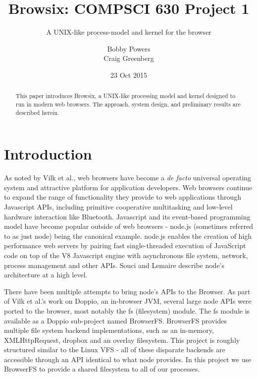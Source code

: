 \documentclass{acm_proc_article-sp}
\begin{document}
\title{Browsix: COMPSCI 630 Project 1}
\subtitle{A UNIX-like process-model and kernel for the browser}

\author{
\alignauthor Bobby Powers\\
\alignauthor Craig Greenberg\\
}
\date{23 Oct 2015}

\maketitle
\begin{abstract}
  This paper introduces Browsix, a UNIX-like processing model and
  kernel designed to run in modern web browsers.  The approach, system
  design, and preliminary results are described herein.
\end{abstract}

\section{Introduction}

As noted by Vilk et al., web browsers have become a \emph{de facto}
universal operating system and attractive platform for application
developers\cite{vilk:2014doppio}.  Web browsers continue to expand the
range of functionality they provide to web applications through
Javascript APIs, including primitive cooperative
multitasking\cite{mcilroy:2015chrome47} and low-level hardware
interaction like Bluetooth\cite{yasskin:2015webbluetooth}.  Javascript
and its event-based programming model have become popular outside of
web browsers - node.js (sometimes referred to as just node) being the
canonical example.  node.js enables the creation of high performance
web servers by pairing fast single-threaded execution of JavaScript
code on top of the V8 Javascript engine with asynchronous file system,
network, process management and other APIs.  Souci and
Lemaire\cite{souci:2014} describe node's architecture at a high level.

There have been multiple attempts to bring node's APIs to the Browser.
As part of Vilk et al.'s work on Doppio, an in-browser JVM, several
large node APIs were ported to the browser, most notably the fs
(filesystem) module.  The fs module is available as a Doppio
sub-project named BrowserFS.  BrowserFS provides multiple file system
backend implementations, such as an in-memory, XMLHttpRequest, dropbox
and an overlay filesystem.  This project is roughly structured similar
to the Linux VFS - all of these disparate backends are accessible
through an API identical to what node provides.  In this project we
use BrowserFS to provide a shared filesystem to all of our processes.
\end{document}

